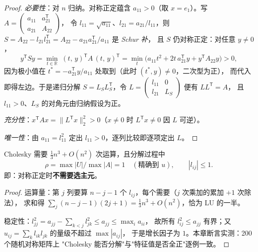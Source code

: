 \begin{proof}
\emph{必要性}：对 $n$ 归纳。对称正定蕴含 $a_{11}>0$（取 $x=e_1$）。写
$A=\begin{pmatrix}a_{11}&a_{21}^{\mathsf T}\\a_{21}&A_{22}\end{pmatrix}$，
令 $l_{11}=\sqrt{a_{11}}$、$l_{21}=a_{21}/l_{11}$，则
$S=A_{22}-l_{21}l_{21}^{\mathsf T}=A_{22}-a_{21}a_{21}^{\mathsf T}/a_{11}$ 是 \emph{Schur 补}，
且 $S$ 仍对称正定：对任意 $y\ne0$，
\begin{equation}
  y^{\mathsf T}Sy=\min_{t\in\mathbb{R}}\;(t,\,y)^{\mathsf T}A\,(t,\,y)^{\mathsf T}
  =\min_{t}\bigl(a_{11}t^{2}+2t\,a_{21}^{\mathsf T}y+y^{\mathsf T}A_{22}y\bigr)>0,
\end{equation}
因为极小值在 $t^\ast=-a_{21}^{\mathsf T}y/a_{11}$ 处取到（此时 $(t^\ast,y)\ne0$，二次型为正），
而代入即得左边。于是递归分解 $S=L_SL_S^{\mathsf T}$，令
$L=\begin{pmatrix}l_{11}&0\\ l_{21}&L_S\end{pmatrix}$ 便有 $LL^{\mathsf T}=A$，
且 $l_{11}>0$、$L_S$ 的对角元由归纳假设为正。

\emph{充分性}：$x^{\mathsf T}Ax=\|L^{\mathsf T}x\|_2^2>0$（$x\ne0$ 时 $L^{\mathsf T}x\ne0$ 因 $L$ 可逆）。

\emph{唯一性}：由 $a_{11}=l_{11}^2$ 定出 $l_{11}>0$，逐列比较即逐项定出 $L$。
\end{proof}

\begin{theorem}[运算量与稳定性]
\label{thm:chol-flops}
Cholesky 需要 $\frac13n^3+O(n^2)$ 次运算，且分解过程中
\begin{equation}
  \rho=\max|U|/\max|A|=1\quad(\text{精确到 }u),\qquad |l_{ij}|\le1 .
\end{equation}
即：对称正定时\textbf{不需要选主元}。
\end{theorem}

\begin{proof}
运算量：第 $j$ 列要算 $n-j-1$ 个 $l_{ij}$，每个需要（$j$ 次乘加的累加 $+1$ 次除法），
求和得 $\sum_j(n-j-1)(2j+1)=\frac13n^3+O(n^2)$，恰为 LU 的一半。

稳定性：$l_{jj}^2=a_{jj}-\sum_{k<j}l_{jk}^2\le a_{jj}\le\max_i a_{ii}$，
故所有 $l_{ij}^2\le a_{jj}$ 有界；又 $u_{ij}=\sum_k l_{ik}l_{jk}$ 的量级不超过 $\max|a_{ij}|$，
于是增长因子为 $1$。本章断言实测：200 个随机对称矩阵上
"Cholesky 能否分解"与"特征值是否全正"逐例一致。
\end{proof}

